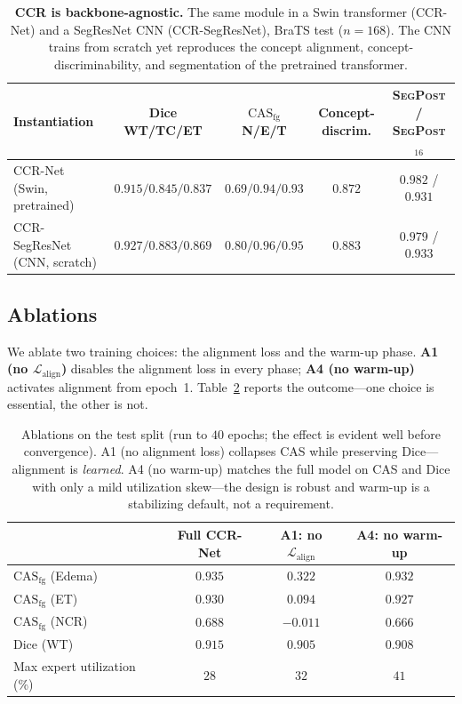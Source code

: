 \documentclass[runningheads]{llncs}
\newcommand{\casfg}{\mathrm{CAS}_{\mathrm{fg}}}
\begin{document}
\begin{table}[t]
\centering
\caption{\textbf{CCR is backbone-agnostic.} The same module in a Swin transformer (CCR-Net) and
a SegResNet CNN (CCR-SegResNet), BraTS test ($n{=}168$). The CNN trains from scratch yet
reproduces the concept alignment, concept-discriminability, and segmentation of the pretrained
transformer.}
\label{tab:backbone}
\begin{tabular}{lcccc}
\toprule
Instantiation & Dice WT/TC/ET & $\casfg$ N/E/T & Concept-discrim. & \textsc{SegPost} / \textsc{SegPost}$_{16}$ \\
\midrule
CCR-Net (Swin, pretrained)   & $0.915/0.845/0.837$ & $0.69/0.94/0.93$ & $0.872$ & $0.982$ / $0.931$ \\
CCR-SegResNet (CNN, scratch) & $0.927/0.883/0.869$ & $0.80/0.96/0.95$ & $0.883$ & $0.979$ / $0.933$ \\
\bottomrule
\end{tabular}
\end{table}

\subsection{Ablations}
We ablate two training choices: the alignment loss and the warm-up phase. \textbf{A1 (no
$\mathcal{L}_{\text{align}}$)} disables the alignment loss in every phase; \textbf{A4 (no
warm-up)} activates alignment from epoch~1. Table~\ref{tab:abl} reports the outcome---one choice
is essential, the other is not.

\begin{table}[t]
\centering
\caption{Ablations on the test split (run to $40$ epochs; the effect is evident well before
convergence). A1 (no alignment loss) collapses CAS while preserving Dice---alignment is
\emph{learned}. A4 (no warm-up) matches the full model on CAS and Dice with only a mild
utilization skew---the design is robust and warm-up is a stabilizing default, not a requirement.}
\label{tab:abl}
\begin{tabular}{lccc}
\toprule
& Full CCR-Net & A1: no $\mathcal{L}_{\text{align}}$ & A4: no warm-up \\
\midrule
$\casfg$ (Edema)            & $0.935$ & $0.322$  & $0.932$ \\
$\casfg$ (ET)               & $0.930$ & $0.094$  & $0.927$ \\
$\casfg$ (NCR)              & $0.688$ & $-0.011$ & $0.666$ \\
Dice (WT)                   & $0.915$ & $0.905$  & $0.908$ \\
Max expert utilization (\%) & $28$    & $32$     & $41$ \\
\bottomrule
\end{tabular}
\end{table}
\end{document}
